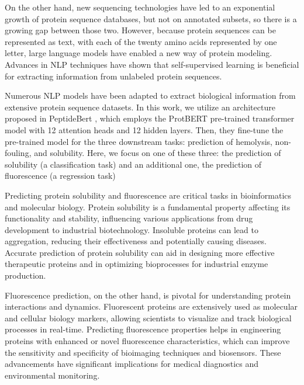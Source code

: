 \documentclass[letterpaper,spanish,reprint,nofootinbib,showkeys,aps]{revtex4-2}
\begin{document}
On the other hand, new sequencing technologies have led to an exponential growth of protein sequence databases, but not on annotated subsets, so there is a growing gap between those two. \cite{TAPE}
However, because protein sequences can be represented as text, with each of the twenty amino acids represented by one letter, large language models have enabled a new way of protein modeling. Advances in NLP techniques have shown that self-supervised learning is beneficial for extracting information from unlabeled protein sequences. \cite{ProtTrans}\cite{TAPE}

Numerous NLP models have been adapted to extract biological information from extensive protein sequence datasets. In this work, we utilize an architecture proposed in PeptideBert \cite{peptidebert}, which employs the ProtBERT \cite{ProtTrans} pre-trained transformer model with 12 attention heads and 12 hidden layers. Then, they fine-tune the pre-trained model for the three downstream tasks: prediction of hemolysis, non-fouling, and solubility. Here, we focus on one of these three: the prediction of solubility (a classification task) and an additional one, the prediction of fluorescence (a regression task)

Predicting protein solubility and fluorescence are critical tasks in bioinformatics and molecular biology. Protein solubility is a fundamental property affecting its functionality and stability, influencing various applications from drug development to industrial biotechnology. Insoluble proteins can lead to aggregation, reducing their effectiveness and potentially causing diseases. Accurate prediction of protein solubility can aid in designing more effective therapeutic proteins and in optimizing bioprocesses for industrial enzyme production. \cite{peer}\cite{peptidebert}

Fluorescence prediction, on the other hand, is pivotal for understanding protein interactions and dynamics. Fluorescent proteins are extensively used as molecular and cellular biology markers, allowing scientists to visualize and track biological processes in real-time. Predicting fluorescence properties helps in engineering proteins with enhanced or novel fluorescence characteristics, which can improve the sensitivity and specificity of bioimaging techniques and biosensors. These advancements have significant implications for medical diagnostics and environmental monitoring.\cite{shallowcnn}\cite{zhang2024}
\end{document}
